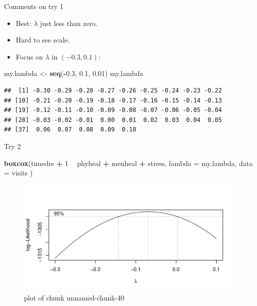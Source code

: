 \documentclass[ignorenonframetext,]{beamer}
\newenvironment{Shaded}{\begin{snugshade}}{\end{snugshade}}
\newcommand{\DataTypeTok}[1]{\textcolor[rgb]{0.13,0.29,0.53}{#1}}
\newcommand{\DecValTok}[1]{\textcolor[rgb]{0.00,0.00,0.81}{#1}}
\newcommand{\FloatTok}[1]{\textcolor[rgb]{0.00,0.00,0.81}{#1}}
\newcommand{\KeywordTok}[1]{\textcolor[rgb]{0.13,0.29,0.53}{\textbf{#1}}}
\newcommand{\NormalTok}[1]{#1}
\newcommand{\OperatorTok}[1]{\textcolor[rgb]{0.81,0.36,0.00}{\textbf{#1}}}
\newcommand{\StringTok}[1]{\textcolor[rgb]{0.31,0.60,0.02}{#1}}
\begin{document}
\begin{frame}[fragile]{Comments on try 1}
\protect\hypertarget{comments-on-try-1}{}

\begin{itemize}
\item
  Best: \(\lambda\) just less than zero.
\item
  Hard to see scale.
\item
  Focus on \(\lambda\) in \((-0.3,0.1)\):
\end{itemize}

\footnotesize

\begin{Shaded}
\begin{Highlighting}[]
\NormalTok{my.lambda <-}\StringTok{ }\KeywordTok{seq}\NormalTok{(}\OperatorTok{-}\FloatTok{0.3}\NormalTok{, }\FloatTok{0.1}\NormalTok{, }\FloatTok{0.01}\NormalTok{)}
\NormalTok{my.lambda}
\end{Highlighting}
\end{Shaded}

\begin{verbatim}
##  [1] -0.30 -0.29 -0.28 -0.27 -0.26 -0.25 -0.24 -0.23 -0.22
## [10] -0.21 -0.20 -0.19 -0.18 -0.17 -0.16 -0.15 -0.14 -0.13
## [19] -0.12 -0.11 -0.10 -0.09 -0.08 -0.07 -0.06 -0.05 -0.04
## [28] -0.03 -0.02 -0.01  0.00  0.01  0.02  0.03  0.04  0.05
## [37]  0.06  0.07  0.08  0.09  0.10
\end{verbatim}

\normalsize

\end{frame}

\begin{frame}[fragile]{Try 2}
\protect\hypertarget{try-2}{}

\begin{Shaded}
\begin{Highlighting}[]
\KeywordTok{boxcox}\NormalTok{(timedrs }\OperatorTok{+}\StringTok{ }\DecValTok{1} \OperatorTok{~}\StringTok{ }\NormalTok{phyheal }\OperatorTok{+}\StringTok{ }\NormalTok{menheal }\OperatorTok{+}\StringTok{ }\NormalTok{stress,}
  \DataTypeTok{lambda =}\NormalTok{ my.lambda,}
  \DataTypeTok{data =}\NormalTok{ visits}
\NormalTok{)}
\end{Highlighting}
\end{Shaded}

\begin{figure}
\centering
\includegraphics{figure/unnamed-chunk-40-1.pdf}
\caption{plot of chunk unnamed-chunk-40}
\end{figure}

\end{frame}
\end{document}
